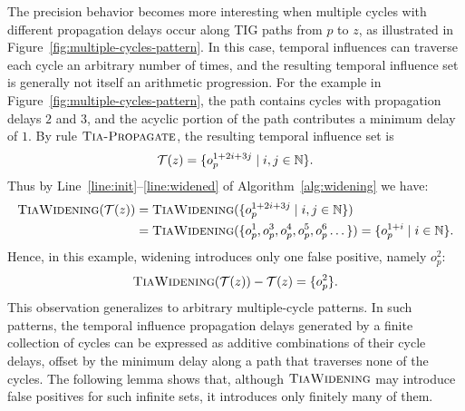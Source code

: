 The precision behavior becomes more interesting when multiple cycles with different propagation delays occur along TIG paths from $p$ to $z$, as illustrated in Figure~\ref{fig:multiple-cycles-pattern}.
In this case, temporal influences can traverse each cycle an arbitrary number of times, and the resulting temporal influence set is generally not itself an arithmetic progression.
For the example in Figure~\ref{fig:multiple-cycles-pattern}, the path contains cycles with propagation delays $2$ and $3$, and the acyclic portion of the path contributes a minimum delay of $1$.
By rule $\textsc{Tia-Propagate}$, the resulting temporal influence set is
\[
\mathcal{T}(z)=\{o_p^{1+2i+3j}\mid i,j\in\mathbb{N}\}.
\]
Thus by Line~\ref{line:init}--\ref{line:widened} of Algorithm~\ref{alg:widening} we have:
\[
\begin{aligned}
    \textsc{TiaWidening}(\mathcal{T}(z)) & = \textsc{TiaWidening}(\{o_p^{1+2i+3j} \mid i, j\in \mathbb{N}\})\\
    & = \textsc{TiaWidening}(\{o_p^1, o_p^3, o_p^4, o_p^5, o_p^6 \dots\}) = \{o_p^{1+i} \mid i \in \mathbb{N}\}.\\
\end{aligned}
\]
Hence, in this example, widening introduces only one false positive, namely $o_p^2$:
\[
\textsc{TiaWidening}(\mathcal{T}(z))-\mathcal{T}(z)=\{o_p^2\}.
\]
This observation generalizes to arbitrary multiple-cycle patterns.
In such patterns, the temporal influence propagation delays generated by a finite collection of cycles can be expressed as additive combinations of their cycle delays, offset by the minimum delay along a path that traverses none of the cycles.
The following lemma shows that, although $\textsc{TiaWidening}$ may introduce false positives for such infinite sets, it introduces only finitely many of them.

